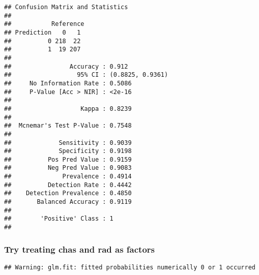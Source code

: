 \documentclass[
]{article}
\newenvironment{Shaded}{\begin{snugshade}}{\end{snugshade}}
\newcommand{\AttributeTok}[1]{\textcolor[rgb]{0.77,0.63,0.00}{#1}}
\newcommand{\CommentTok}[1]{\textcolor[rgb]{0.56,0.35,0.01}{\textit{#1}}}
\newcommand{\FunctionTok}[1]{\textcolor[rgb]{0.00,0.00,0.00}{#1}}
\newcommand{\NormalTok}[1]{#1}
\newcommand{\OtherTok}[1]{\textcolor[rgb]{0.56,0.35,0.01}{#1}}
\newcommand{\SpecialCharTok}[1]{\textcolor[rgb]{0.00,0.00,0.00}{#1}}
\begin{document}
\begin{verbatim}
## Confusion Matrix and Statistics
## 
##           Reference
## Prediction   0   1
##          0 218  22
##          1  19 207
##                                           
##                Accuracy : 0.912           
##                  95% CI : (0.8825, 0.9361)
##     No Information Rate : 0.5086          
##     P-Value [Acc > NIR] : <2e-16          
##                                           
##                   Kappa : 0.8239          
##                                           
##  Mcnemar's Test P-Value : 0.7548          
##                                           
##             Sensitivity : 0.9039          
##             Specificity : 0.9198          
##          Pos Pred Value : 0.9159          
##          Neg Pred Value : 0.9083          
##              Prevalence : 0.4914          
##          Detection Rate : 0.4442          
##    Detection Prevalence : 0.4850          
##       Balanced Accuracy : 0.9119          
##                                           
##        'Positive' Class : 1               
## 
\end{verbatim}

\hypertarget{try-treating-chas-and-rad-as-factors}{%
\subsubsection{Try treating chas and rad as
factors}\label{try-treating-chas-and-rad-as-factors}}

\begin{Shaded}
\end{Shaded}

\begin{verbatim}
## Warning: glm.fit: fitted probabilities numerically 0 or 1 occurred
\end{verbatim}
\end{document}
